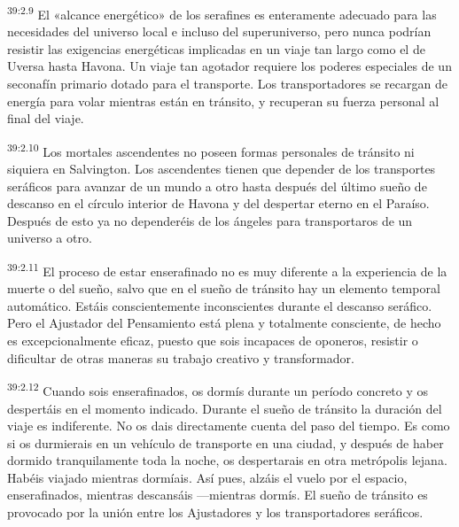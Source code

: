 \par
\textsuperscript{39:2.9} El «alcance energético» de los serafines es enteramente adecuado para las necesidades del universo local e incluso del superuniverso, pero nunca podrían resistir las exigencias energéticas implicadas en un viaje tan largo como el de Uversa hasta Havona. Un viaje tan agotador requiere los poderes especiales de un seconafín primario dotado para el transporte. Los transportadores se recargan de energía para volar mientras están en tránsito, y recuperan su fuerza personal al final del viaje.

\par
\textsuperscript{39:2.10} Los mortales ascendentes no poseen formas personales de tránsito ni siquiera en Salvington. Los ascendentes tienen que depender de los transportes seráficos para avanzar de un mundo a otro hasta después del último sueño de descanso en el círculo interior de Havona y del despertar eterno en el Paraíso. Después de esto ya no dependeréis de los ángeles para transportaros de un universo a otro.

\par
\textsuperscript{39:2.11} El proceso de estar enserafinado no es muy diferente a la experiencia de la muerte o del sueño, salvo que en el sueño de tránsito hay un elemento temporal automático. Estáis conscientemente inconscientes durante el descanso seráfico. Pero el Ajustador del Pensamiento está plena y totalmente consciente, de hecho es excepcionalmente eficaz, puesto que sois incapaces de oponeros, resistir o dificultar de otras maneras su trabajo creativo y transformador.

\par
\textsuperscript{39:2.12} Cuando sois enserafinados, os dormís durante un período concreto y os despertáis en el momento indicado. Durante el sueño de tránsito la duración del viaje es indiferente. No os dais directamente cuenta del paso del tiempo. Es como si os durmierais en un vehículo de transporte en una ciudad, y después de haber dormido tranquilamente toda la noche, os despertarais en otra metrópolis lejana. Habéis viajado mientras dormíais. Así pues, alzáis el vuelo por el espacio, enserafinados, mientras descansáis ---mientras dormís. El sueño de tránsito es provocado por la unión entre los Ajustadores y los transportadores seráficos.

